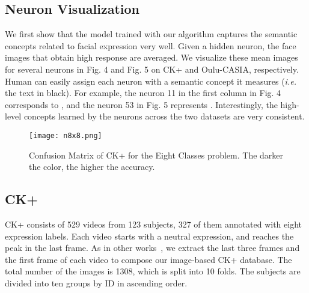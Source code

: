 \documentclass[a4paper, 10pt, conference]{ieeeconf}      %
\begin{document}
\subsection{Neuron Visualization}
We first show that the model trained with our algorithm captures the semantic concepts related to facial expression very well. Given a hidden neuron, the face images that obtain high response are averaged. We visualize these mean images for several neurons in Fig. 4 and Fig. 5 on CK+ and Oulu-CASIA, respectively. Human can easily assign each neuron with a semantic concept it measures (\textit{i.e.} the text in black). For example, the neuron 11 in the first column in Fig. 4 corresponds to , and the neuron 53 in Fig. 5 represents . Interestingly, the high-level concepts learned by the neurons across the two datasets are very consistent.



\begin{figure}[!ht]
  \centering
  \texttt{[image: n8x8.png]}
  \caption{Confusion Matrix of CK+ for the Eight Classes problem. The darker the color, the higher the accuracy.}
  \label{figurelabel}
  \vspace{-2mm}
\end{figure}




\subsection{CK+}
CK+ consists of 529 videos from 123 subjects, 327 of them annotated with eight expression labels. Each video starts with a neutral expression, and reaches the peak in the last frame.  As in other works~\cite{liu2014learning}, we extract the last three frames and the first frame of each video to compose our image-based CK+ database. The total number of the images is 1308, which is split into 10 folds. The subjects are divided into ten groups by ID in ascending order. 
\end{document}
